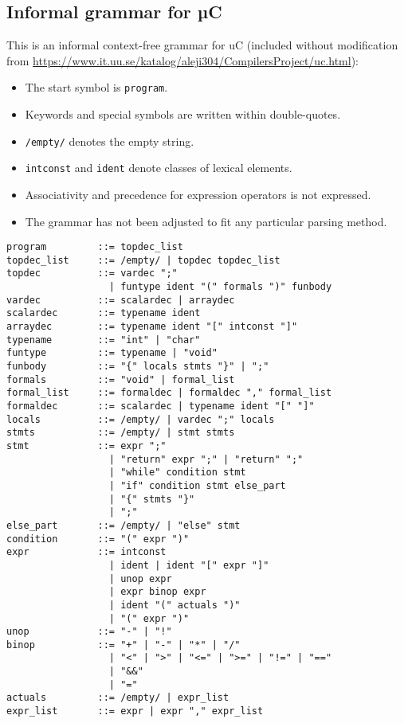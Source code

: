 
\subsection{Informal grammar for µC}
\label{app:informal_grammar_for_uc}

This is an informal context-free grammar for uC (included without modification from \url{https://www.it.uu.se/katalog/aleji304/CompilersProject/uc.html}):

\begin{itemize}
	\item The start symbol is \texttt{program}.
	\item Keywords and special symbols are written within double-quotes.
	\item \texttt{/empty/} denotes the empty string.
	\item \texttt{intconst} and \texttt{ident} denote classes of lexical elements.
	\item Associativity and precedence for expression operators is not expressed.
	\item The grammar has not been adjusted to fit any particular parsing method.
\end{itemize}

\begin{verbatim}
program         ::= topdec_list
topdec_list     ::= /empty/ | topdec topdec_list
topdec          ::= vardec ";"
                  | funtype ident "(" formals ")" funbody
vardec          ::= scalardec | arraydec
scalardec       ::= typename ident
arraydec        ::= typename ident "[" intconst "]"
typename        ::= "int" | "char"
funtype         ::= typename | "void"
funbody         ::= "{" locals stmts "}" | ";"
formals         ::= "void" | formal_list
formal_list     ::= formaldec | formaldec "," formal_list
formaldec       ::= scalardec | typename ident "[" "]"
locals          ::= /empty/ | vardec ";" locals
stmts           ::= /empty/ | stmt stmts
stmt            ::= expr ";"
                  | "return" expr ";" | "return" ";"
                  | "while" condition stmt
                  | "if" condition stmt else_part
                  | "{" stmts "}"
                  | ";"
else_part       ::= /empty/ | "else" stmt
condition       ::= "(" expr ")"
expr            ::= intconst
                  | ident | ident "[" expr "]"
                  | unop expr
                  | expr binop expr
                  | ident "(" actuals ")"
                  | "(" expr ")"
unop            ::= "-" | "!"
binop           ::= "+" | "-" | "*" | "/"
                  | "<" | ">" | "<=" | ">=" | "!=" | "=="
                  | "&&"
                  | "="
actuals         ::= /empty/ | expr_list
expr_list       ::= expr | expr "," expr_list
\end{verbatim}
